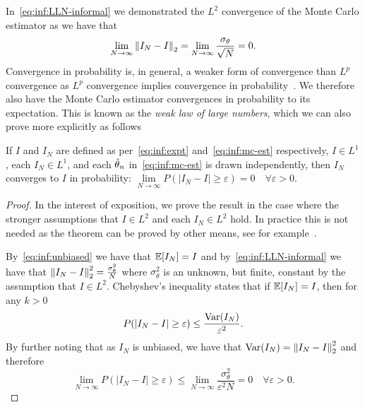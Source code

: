 In~\eqref{eq:inf:LLN-informal} we demonstrated the $L^2$ convergence of the Monte Carlo
estimator as we have that 
\[
\lim\limits_{N\rightarrow\infty} \left\lVert I_N-I\right\rVert_2=\lim\limits_{N\rightarrow\infty} \frac{\sigma_\theta}{\sqrt{N}} = 0.
\]
Convergence in probability is, in general, a weaker form of convergence than $L^p$ convergence
as $L^p$ convergence implies convergence in probability~\citep{williams1991probability}.
We therefore also have the Monte Carlo estimator convergences in
probability to its expectation.  This is known as the
\emph{weak law of large numbers}, which we can also prove more explicitly as follows
\begin{theorem}
	\label{the:inf:weak-law}
If $I$ and $I_N$ are defined as per~\eqref{eq:inf:expt} and~\eqref{eq:inf:mc-est} respectively,
$I\in L^1$, each $I_N \in L^1$,
 and each $\hat{\theta}_n$ in~\eqref{eq:inf:mc-est} is drawn independently, then $I_N$ converges to $I$
in probability:
	$\lim\limits_{N\rightarrow\infty} P(\left|I_N-I\right|\ge \varepsilon)=0 \quad \forall \varepsilon>0$.
\end{theorem}
\begin{proof}
In the interest of exposition, we prove the result in the case where the stronger 
assumptions that $I\in L^2$ and each $I_N \in L^2$ hold.  In practice this is not needed as
the theorem can be proved by other means, see for example~\cite[Theorem 2.2.7]{durrett2010probability}.

By~\eqref{eq:inf:unbiased} we have that $\mathbb{E} [I_N]=I$ and by~\eqref{eq:inf:LLN-informal} we have that 
$\left\lVert I_N-I\right\rVert_2^2 = \frac{\sigma_{\theta}^2}{N}$
where $\sigma_{\theta}^2$ is an unknown, but finite, constant by the assumption that $I\in L^2$.
Chebyshev's inequality states that if $\mathbb{E} [I_N] = I$, then for any $k>0$
\[
P(\left|I_N-I\right|\ge\varepsilon)\le\frac{\mathrm{Var}(I_N)}{\varepsilon^2}.
\]
By further noting that as $I_N$ is unbiased, we have that $\mathrm{Var}(I_N) = \left\lVert I_N-I\right\rVert_2^2$
and therefore
\[
\lim\limits_{N\rightarrow\infty} P(\left|I_N-I\right|\ge\varepsilon)
\le\lim\limits_{N\rightarrow\infty} \frac{\sigma_{\theta}^2}{\varepsilon^2 N}
=0 \quad \forall \varepsilon>0.
\]
\end{proof}

